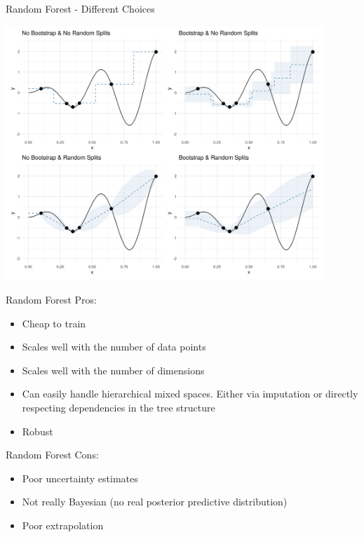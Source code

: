 \documentclass[11pt,compress,t,notes=noshow, xcolor=table]{beamer}
\begin{document}
\begin{frame}{Random Forest - Different Choices}

\begin{center}
  \includegraphics[width = 0.9\textwidth]{figure_man/surrogate_1.png}
\end{center}

\end{frame}

\begin{frame}{Random Forest}
Pros:
\begin{itemize}
  \item Cheap to train
  \item Scales well with the number of data points
  \item Scales well with the number of dimensions
  \item Can easily handle hierarchical mixed spaces. Either via imputation or directly respecting dependencies in the tree structure
  \item Robust
\end{itemize}
\end{frame}

\begin{frame}{Random Forest}
Cons:
\begin{itemize}
  \item Poor uncertainty estimates
  \item Not really Bayesian (no real posterior predictive distribution)
  \item Poor extrapolation
\end{itemize}
\end{frame}
\end{document}
